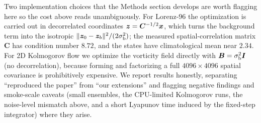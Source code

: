 Two implementation choices that the Methods section develops are worth flagging here so the cost above reads unambiguously. For Lorenz-96 the optimization is carried out in decorrelated coordinates $\bm{z} = \bm{C}^{-1/2}\bm{x}$, which turns the background term into the isotropic $\lVert\bm{z}_0-\bm{z}_b\rVert^2/(2\sigma_{\mathrm{b}}^2)$; the measured spatial-correlation matrix $\bm{C}$ has condition number $8.72$, and the states have climatological mean near $2.34$. For 2D Kolmogorov flow we optimize the vorticity field directly with $\bm{B} = \sigma_{\mathrm{b}}^2 \bm{I}$ (no decorrelation), because forming and factorizing a full $4096\times 4096$ spatial covariance is prohibitively expensive. We report results honestly, separating ``reproduced the paper'' from ``our extensions'' and flagging negative findings and smoke-scale caveats (small ensembles, the CPU-limited Kolmogorov runs, the noise-level mismatch above, and a short Lyapunov time induced by the fixed-step integrator) where they arise.
